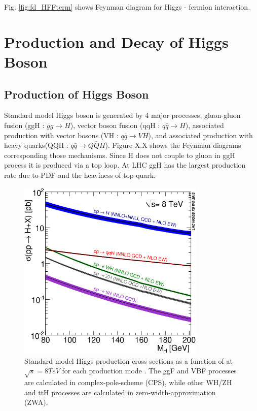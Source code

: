 Fig. \ref{fig:fd_HFFterm} shows Feynman diagram for Higgs - fermion interaction.    





\section{Production and Decay of Higgs Boson}


\subsection{Production of Higgs Boson}
Standard model Higgs boson is generated by 4 major processes, 
gluon-gluon fusion (ggH : $gg \rightarrow H$), 
vector boson fusion (qqH : $q\bar{q}\rightarrow H$),
associated production with vector bosons (VH : $q\bar{q}\rightarrow VH$), and 
associated production with heavy quarks(QQH : $q\bar{q}\rightarrow Q\bar{Q}H$). 
Figure X.X shows the Feynman diagrams corresponding those mechanisms.
Since H does not couple to gluon in ggH process it is produced via a top loop.
At LHC ggH has the largest production rate due to PDF and 
the heaviness of top quark. 
\begin{figure}[t]
\centering
\includegraphics[width=0.8\textwidth]{figures/Higgs_XS_8TeV_LM200.eps}
\caption{ Standard model Higgs production cross sections 
as a function of \mHi{} at $\sqrt{s}=8TeV$ for each 
production mode \cite{Dittmaier:2012vm}. The ggF and VBF processes are 
calculated in complex-pole-scheme (CPS), while other WH/ZH and ttH processes 
are calculated in zero-width-approximation (ZWA). }
\label{fig:Higgs_XS_8TeV_LM200}
\end{figure}

